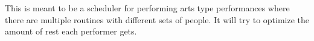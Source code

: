 This is meant to be a scheduler for performing arts type performances where there are multiple routines with different sets of people. It will try to optimize the amount of rest each performer gets. 
